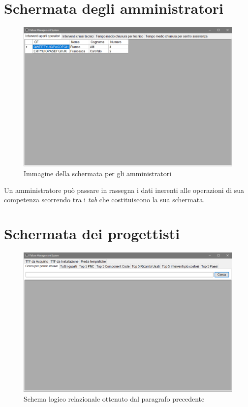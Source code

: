 \documentclass[a4paper, 12pt]{report}
\begin{document}
\section{Schermata degli amministratori}

\begin{figure}[H]
	\centering
	\includegraphics[width=\linewidth]{images/managementScreen.png}
	\caption{Immagine della schermata per gli amministratori}
\end{figure}

Un amministratore può passare in rassegna i dati inerenti alle operazioni di sua competenza scorrendo tra i \textit{tab} che costituiscono la sua schermata.

\section{Schermata dei progettisti}

\begin{figure}[H]
	\centering
	\includegraphics[width=\linewidth]{images/designerScreen.png}
	\caption{Schema logico relazionale ottenuto dal paragrafo precedente}
\end{figure}
\end{document}
